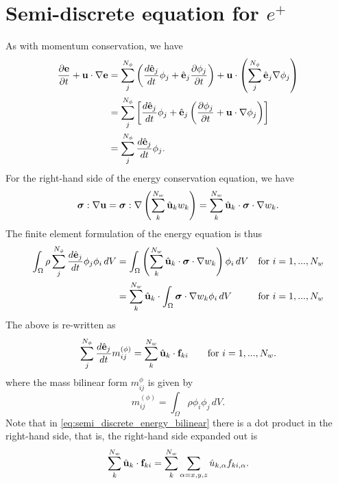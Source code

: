 \documentclass[11pt]{article}
\begin{document}
\section{Semi-discrete equation for $e^+$}
As with momentum conservation, we have
\begin{align}
    \frac{\partial \mathbf{e}}{\partial t} + \mathbf{u} \cdot \nabla \mathbf{e} &= \sum_j^{N_\phi} \left ( \frac{d \hat{\mathbf{e}}_j}{d t} \phi_j + \hat{\mathbf{e}}_j \frac{\partial \phi_j}{\partial t} \right ) + \mathbf{u} \cdot \left ( \sum_j^{N_\phi} \hat{\mathbf{e}}_j \nabla \phi_j \right ) \nonumber \\
    &= \sum_j^{N_\phi} \left [ \frac{d \hat{\mathbf{e}}_j}{d t} \phi_j + \hat{\mathbf{e}}_j \left ( \frac{\partial \phi_j}{\partial t} + \mathbf{u} \cdot \nabla \phi_j \right ) \right ] \nonumber \\
    &= \sum_j^{N_\phi} \frac{d \hat{\mathbf{e}}_j}{d t} \phi_j.
\end{align}
For the right-hand side of the energy conservation equation, we have
\begin{equation}
    \bm \sigma : \nabla \mathbf{u} = \bm \sigma : \nabla \left ( \sum_k^{N_w} \hat{\mathbf{u}}_k w_k \right ) = \sum_k^{N_w} \hat{\mathbf{u}}_k \cdot \bm \sigma \cdot \nabla w_k.
\end{equation}
The finite element formulation of the energy equation is thus 
\begin{align}
    \int_\Omega \rho \sum_j^{N_\phi} \frac{d \hat{\mathbf{e}}_j}{d t} \phi_j \phi_i \, dV &= \int_\Omega \left ( \sum_k^{N_w} \hat{\mathbf{u}}_k \cdot \bm \sigma \cdot \nabla w_k \right ) \phi_i \, dV &\text{for } i = 1,...,N_w \nonumber \\
    &=\sum_k^{N_w} \hat{\mathbf{u}}_k \cdot \int_\Omega \bm \sigma \cdot \nabla w_k \phi_i \, dV &\text{for } i = 1,...,N_w
\end{align}
The above is re-written as
\begin{equation}
    \label{eq:semi_discrete_energy_bilinear}
    \sum_j^{N_\phi} \frac{d \hat{\mathbf{e}}_j}{d t} m^{(\phi)}_{ij} = \sum_k^{N_w} \hat{\mathbf{u}}_k \cdot \mathbf{f}_{ki} \qquad \text{for } i = 1,...,N_w.
\end{equation}
where the mass bilinear form $m^{\phi}_{ij}$ is given by 
\begin{equation}
    m^{(\phi)}_{ij} = \int_\Omega \rho \phi_i \phi_j \, dV.
\end{equation}
Note that in \cref{eq:semi_discrete_energy_bilinear} there is a dot product in the right-hand side, that is, the right-hand side expanded out is  
\begin{equation}
    \sum_k^{N_w} \hat{\mathbf{u}}_k \cdot \mathbf{f}_{ki} = \sum_k^{N_w} \sum_{\alpha=x,y,z} \hat{u}_{k,\alpha} f_{ki,\alpha}.
\end{equation}
\end{document}
